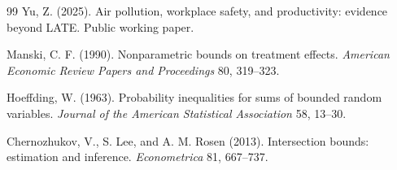 \documentclass{article}
\begin{document}
\begin{thebibliography}{99}
   Yu, Z. (2025). Air pollution, workplace safety, and productivity: evidence beyond LATE. Public working paper.

   Manski, C. F. (1990). Nonparametric bounds on treatment effects. \emph{American Economic Review Papers and Proceedings} 80, 319--323.

   Hoeffding, W. (1963). Probability inequalities for sums of bounded random variables. \emph{Journal of the American Statistical Association} 58, 13--30.

   Chernozhukov, V., S. Lee, and A. M. Rosen (2013). Intersection bounds: estimation and inference. \emph{Econometrica} 81, 667--737.

\end{thebibliography}
\end{document}

